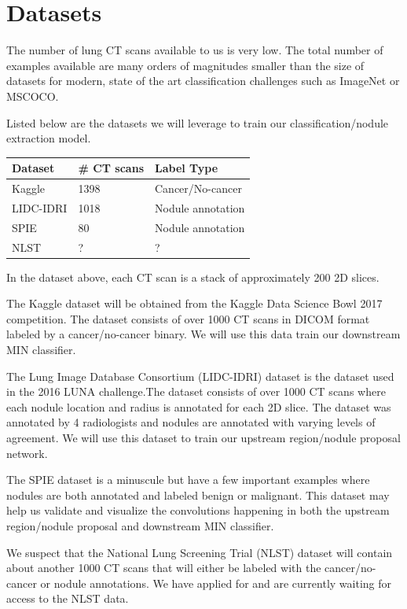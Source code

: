 \documentclass[twocolumn,10pt]{article}
\begin{document}
\section{Datasets}
The number of lung CT scans available to us is very low. The total number of examples
available are many orders of magn{}itudes smaller than the size of datasets for modern,
state of the art classification challenges such as ImageNet or MSCOCO.

Listed below are the datasets we will leverage to train our classification/nodule
extraction model.

\begin{center}
\begin{tabular}{lll}
  \toprule
  Dataset & \# CT scans & Label Type\\
  \midrule
  Kaggle&1398&Cancer/No-cancer\\
  LIDC-IDRI&1018&Nodule annotation\\
  SPIE&80&Nodule annotation\\
  NLST&?&?\\
\end{tabular}
\end{center}

In the dataset above, each CT scan is a stack of 
approximately 200 2D slices.

The Kaggle dataset will be obtained from the Kaggle Data Science Bowl 2017
competition. The dataset consists of over 1000 CT scans in DICOM format labeled
by a cancer/no-cancer binary. We will use this data train our downstream
 MIN classifier.

The Lung Image Database Consortium (LIDC-IDRI) dataset is the dataset used in 
the 2016 LUNA challenge.The dataset consists of over 1000 CT scans where
each nodule location and radius is annotated for each 2D slice. The dataset was
annotated by 4 radiologists and nodules are annotated with varying levels of 
agreement. We will use this dataset to train our upstream region/nodule 
proposal network.

The SPIE dataset is a minuscule but have a few important examples where nodules
are both annotated and labeled benign or malignant. This dataset may help us 
validate and visualize the convolutions happening in both the upstream
region/nodule proposal and downstream MIN classifier.

We suspect that the National Lung Screening Trial (NLST) dataset will contain 
about another 1000 CT scans that will either be labeled with the 
cancer/no-cancer or nodule annotations. We have applied for and are
currently waiting for access to the NLST data.
\end{document}
